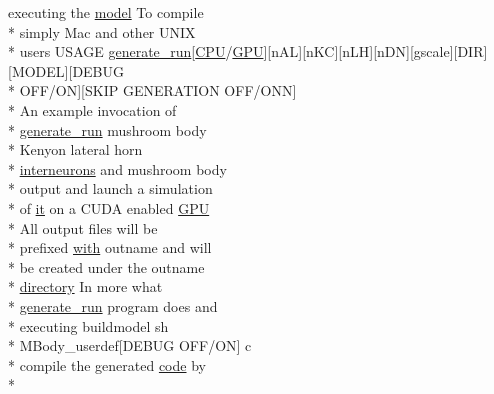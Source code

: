 \begin{DoxyCompactItemize}
executing the \hyperlink{README_8txt_a69fd801b7213948c12d9dd7eebb3ed14}{model} To compile \\*
simply Mac and other U\+N\+I\+X \\*
users U\+S\+A\+G\+E \hyperlink{userproject_2MBody__userdef__project_2README_8txt_a320a215d1e27b4de394be70e90d22863}{generate\+\_\+run}\mbox{[}\hyperlink{README_8txt_a74a069e3c75797de2636c4dd14daa147}{C\+P\+U}/\hyperlink{modelSpec_8h_a39cb9803524b6f3b783344b2f89867b4}{G\+P\+U}\mbox{]}\mbox{[}n\+A\+L\mbox{]}\mbox{[}n\+K\+C\mbox{]}\mbox{[}n\+L\+H\mbox{]}\mbox{[}n\+D\+N\mbox{]}\mbox{[}gscale\mbox{]}\mbox{[}D\+I\+R\mbox{]}\mbox{[}M\+O\+D\+E\+L\mbox{]}\mbox{[}D\+E\+B\+U\+G \\*
O\+F\+F/O\+N\mbox{]}\mbox{[}S\+K\+I\+P G\+E\+N\+E\+R\+A\+T\+I\+O\+N O\+F\+F/O\+N\+N\mbox{]} \\*
An example invocation of \\*
\hyperlink{userproject_2MBody__userdef__project_2README_8txt_a320a215d1e27b4de394be70e90d22863}{generate\+\_\+run} mushroom body \\*
Kenyon lateral horn \\*
\hyperlink{userproject_2SynDelay__project_2README_8txt_adf6327d22e2c11a62a22ab5afd4f2b81}{interneurons} and mushroom body \\*
output and launch a simulation \\*
of \hyperlink{userproject_2PoissonIzh__project_2README_8txt_a3e3bbb6c9b14c38757cf273a117e43e8}{it} on a C\+U\+D\+A enabled \hyperlink{modelSpec_8h_a39cb9803524b6f3b783344b2f89867b4}{G\+P\+U} \\*
All output files will be \\*
prefixed \hyperlink{userproject_2OneComp__project_2README_8txt_ace09bb40fbf4457ad9a9340a67a4fa9a}{with} outname and will \\*
be created under the outname \\*
\hyperlink{README_8txt_ae619b68020535fba5ac79522a0d9d1c4}{directory} In more what \\*
\hyperlink{userproject_2MBody__userdef__project_2README_8txt_a320a215d1e27b4de394be70e90d22863}{generate\+\_\+run} program does and \\*
executing buildmodel sh \\*
M\+Body\+\_\+userdef\mbox{[}D\+E\+B\+U\+G O\+F\+F/O\+N\mbox{]} c \\*
compile the generated \hyperlink{userproject_2MBody__userdef__project_2README_8txt_aeec4e596748e7c29dd5548dae4c70685}{code} by \\*

\end{DoxyCompactItemize}
